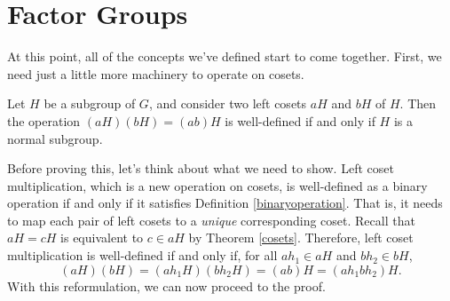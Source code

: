 \section{Factor Groups}

At this point, all of the concepts we've defined start to come together. First, we need just a little more machinery to operate on cosets.

\begin{theorem}
Let $H$ be a subgroup of $G$, and consider two left cosets $aH$ and $bH$ of $H$. Then the operation $(aH)(bH) = (ab)H$ is well-defined if and only if $H$ is a normal subgroup.
\end{theorem}

Before proving this, let's think about what we need to show. Left coset multiplication, which is a new operation on cosets, is well-defined as a binary operation if and only if it satisfies Definition \ref{binaryoperation}. That is, it needs to map each pair of left cosets to a \textit{unique} corresponding coset. Recall that $aH = cH$ is equivalent to $c \in aH$ by Theorem \ref{cosets}. Therefore, left coset multiplication is well-defined if and only if, for all $ah_1 \in aH$ and $bh_2 \in bH$,
\begin{equation*}
    (aH)(bH) = (ah_1H)(bh_2H) = (ab)H = (ah_1bh_2)H.
\end{equation*}
With this reformulation, we can now proceed to the proof.

